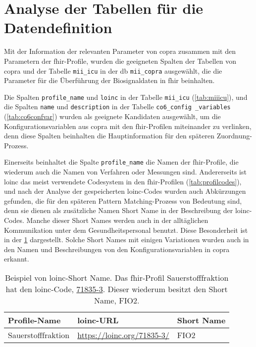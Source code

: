 \section{Analyse der Tabellen für die Datendefinition} \label{sec:analysiscolums}

Mit der Information der relevanten Parameter von \ac{copra} zusammen mit den Parametern der \ac{fhir}-Profile, wurden die geeigneten Spalten der Tabellen von \ac{copra} und der Tabelle \texttt{mii\_icu} in der \ac{db} \texttt{mii\_copra} ausgewählt, die die Parameter für die Überführung der Biosignaldaten in \ac{fhir} beinhalten.

Die Spalten \texttt{profile\_name} und \texttt{loinc} in der Tabelle \texttt{mii\_icu} (\ref{tab:miiicu}), und die Spalten \texttt{name} und \texttt{description} in der Tabelle \texttt{co6\_config \_variables} (\ref{tab:co6confvar}) wurden als geeignete Kandidaten ausgewählt, um die Konfigurationsvariablen aus \ac{copra} mit den \ac{fhir}-Profilen miteinander zu verlinken, denn diese Spalten beinhalten die Hauptinformation für den späteren Zuordnung-Prozess.
 
 Einerseits beinhaltet die Spalte \texttt{profile\_name} die Namen der \ac{fhir}-Profile, die wiederum auch die Namen von Verfahren oder Messungen sind. Andererseits ist \ac{loinc} das meist verwendete Codesystem in den \ac{fhir}-Profilen (\ref{tab:profilcodes}), und nach der Analyse der gespeicherten \ac{loinc}-Codes wurden auch Abkürzungen gefunden, die für den späteren Pattern Matching-Prozess von Bedeutung sind, denn sie dienen als zusätzliche Namen \glqq Short Name\grqq{} in der Beschreibung der \ac{loinc}-Codes. Manche dieser \glqq Short Names\grqq{} werden auch in der alltäglichen Kommunikation unter dem Gesundheitspersonal benutzt. Diese Besonderheit ist in der \ref{tab:shortname} dargestellt. Solche \glqq Short Names\grqq{} mit einigen Variationen wurden auch in den Namen und Beschreibungen von den Konfigurationsvariablen in \ac{copra} erkannt.

\begin{table}[ht]
	\centering 
	\caption[Beispiel von \acs{loinc}-\glqq Short Name\grqq{}]{Beispiel von \acs{loinc}-\glqq Short Name\grqq{}. Das \ac{fhir}-Profil \glqq Sauerstofffraktion\grqq{} hat den \ac{loinc}-Code, \href{https://loinc.org/71835-3/}{71835-3}. Dieser wiederum besitzt den \glqq Short Name\grqq{}, 
		FIO2.}
	\label{tab:shortname}
	\begin{tabular}{|p{4cm}|l|l|}
		\hline
		\rowcolor{lightgray} Profile-Name & \ac{loinc}-URL & Short Name \\ \hline
		Sauerstofffraktion & \url{https://loinc.org/71835-3/} & 
		FIO2 \\ \hline 
	\end{tabular}
\end{table}

